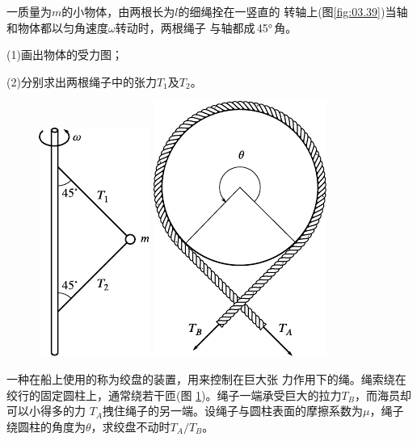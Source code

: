 \begin{exercises}
\exercise 一质量为$ m $的小物体，由两根长为$ l $的细绳拴在一竖直的
转轴上(图\ref{fig:03.39})当轴和物体都以匀角速度$ \omega $转动时，两根绳子
与轴都成\,\ang{45}\,角。

(1)画出物体的受力图；

(2)分别求出两根绳子中的张力$ T_1 $及$ T_2 $。

\begin{figure}[h]
  \begin{minipage}[b]{0.5\linewidth}
    \centering
    \includegraphics{figure/fig03.39}
    \caption{}
    \label{fig:03.39}
  \end{minipage}
  \begin{minipage}[b]{0.5\linewidth}
    \centering
    \includegraphics{figure/fig03.40}
    \caption{}
    \label{fig:03.40}
  \end{minipage}
  \vspace{-1.56em}
\end{figure}

\exercise 一种在船上使用的称为绞盘的装置，用来控制在巨大张
力作用下的绳。绳索绕在绞行的固定圆柱上，通常绕若干匝(图
\ref{fig:03.40})。绳子一端承受巨大的拉力$  T _ { B }  $，而海员却可以小得多的力
$ T_A $拽住绳子的另一端。设绳子与圆柱表面的摩擦系数为$ \mu $，绳子
绕圆柱的角度为$ \theta $，求绞盘不动时$ T_A / T_B $。


\end{exercises}
